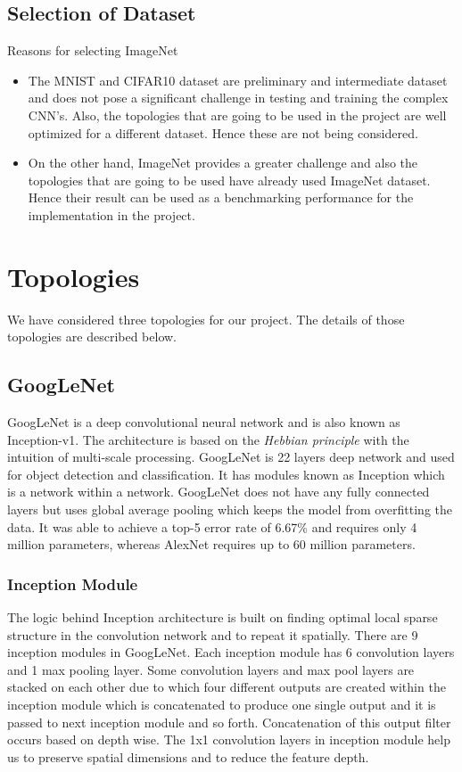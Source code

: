 \documentclass[titlepage]{report}
\begin{document}
\subsection{Selection of Dataset}
Reasons for selecting ImageNet
\begin{itemize}
    \item The MNIST and CIFAR10 dataset are preliminary and intermediate dataset and does not pose a significant challenge in testing and training the complex CNN’s. Also, the topologies that are going to be used in the project are well optimized for a different dataset. Hence these are not being considered.
    \item On the other hand, ImageNet provides a greater challenge and also the topologies that are going to be used have already used ImageNet dataset. Hence their result can be used as a benchmarking performance for the implementation in the project.
\end{itemize}



\section{Topologies}
We have considered three topologies for our project. The details of those topologies are described below.

\subsection{GoogLeNet}
GoogLeNet is a deep convolutional neural network and is also known as Inception-v1. The architecture is based on the \textit{Hebbian principle} with the intuition of multi-scale processing. GoogLeNet is 22 layers deep network and used for object detection and classification. It has modules known as Inception which is a network within a network. GoogLeNet does not have any fully connected layers but uses global average pooling which keeps the model from overfitting the data. It was able to achieve a top-5 error rate of 6.67\% and requires only 4 million parameters, whereas AlexNet requires up to 60 million parameters.

\subsubsection{Inception Module}
The logic behind Inception architecture is built on finding optimal local sparse structure in the convolution network and to repeat it spatially. There are 9 inception modules in GoogLeNet. Each inception module has 6 convolution layers and 1 max pooling layer. Some convolution layers and max pool layers are stacked on each other due to which four different outputs are created within the inception module which is concatenated to produce one single output and it is passed to next inception module and so forth. Concatenation of this output filter occurs based on depth wise. The 1x1 convolution layers in inception module help us to preserve spatial dimensions and to reduce the feature depth.
\end{document}

